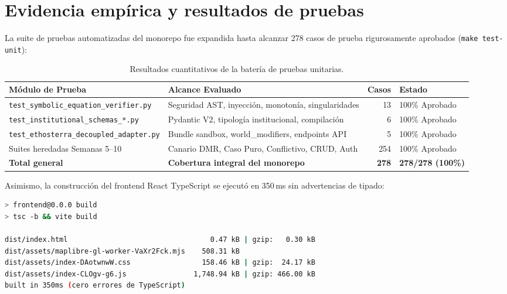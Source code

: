 \documentclass[11pt,a4paper]{article}
\begin{document}
\section{Evidencia emp\'irica y resultados de pruebas}

La suite de pruebas automatizadas del monorepo fue expandida hasta alcanzar 278 casos de prueba rigurosamente aprobados (\texttt{make test-unit}):

\begin{table}[H]
\centering
\small
\caption{Resultados cuantitativos de la bater\'ia de pruebas unitarias.}
\label{tab:pruebas}
\begin{tabularx}{\textwidth}{lp{6.0cm}rX}
\toprule
\textbf{M\'odulo de Prueba} & \textbf{Alcance Evaluado} & \textbf{Casos} & \textbf{Estado} \\
\midrule
\texttt{test\_symbolic\_equation\_verifier.py} & Seguridad AST, inyecci\'on, monoton\'ia, singularidades & 13 & 100\% Aprobado \\
\texttt{test\_institutional\_schemas\_*.py} & Pydantic V2, tipolog\'ia institucional, compilaci\'on & 6 & 100\% Aprobado \\
\texttt{test\_ethosterra\_decoupled\_adapter.py} & Bundle sandbox, world\_modifiers, endpoints API & 5 & 100\% Aprobado \\
Suites heredadas Semanas 5--10 & Canario DMR, Caso Puro, Conflictivo, CRUD, Auth & 254 & 100\% Aprobado \\
\midrule
\textbf{Total general} & \textbf{Cobertura integral del monorepo} & \textbf{278} & \textbf{278/278 (100\%)} \\
\bottomrule
\end{tabularx}
\end{table}

Asimismo, la construcci\'on del frontend React TypeScript se ejecut\'o en 350\,ms sin advertencias de tipado:
\begin{lstlisting}[language=bash, caption={Reporte de compilaci\'on limpia del frontend.}]
> frontend@0.0.0 build
> tsc -b && vite build

dist/index.html                                  0.47 kB | gzip:   0.30 kB
dist/assets/maplibre-gl-worker-VaXr2Fck.mjs    508.31 kB
dist/assets/index-DAotwnwW.css                 158.46 kB | gzip:  24.17 kB
dist/assets/index-CLOgv-g6.js                1,748.94 kB | gzip: 466.00 kB
built in 350ms (cero errores de TypeScript)
\end{lstlisting}
\end{document}
